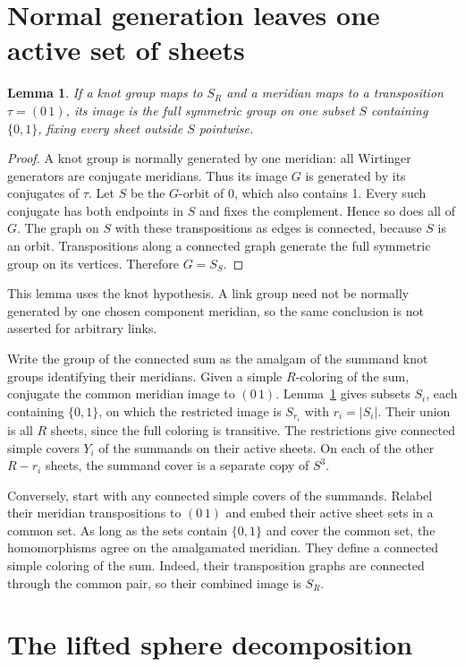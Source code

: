 \documentclass[11pt]{article}
\newtheorem{lemma}[theorem]{Lemma}
\begin{document}
\section{Normal generation leaves one active set of sheets}

\begin{lemma}\label{lem:orbit}
If a knot group maps to $S_R$ and a meridian maps to a
transposition $\tau=(0\,1)$, its image is the full symmetric
group on one subset $S$ containing $\{0,1\}$, fixing every
sheet outside $S$ pointwise.
\end{lemma}
\begin{proof}
A knot group is normally generated by one meridian: all
Wirtinger generators are conjugate meridians. Thus its
image $G$ is generated by its conjugates of $\tau$.
Let $S$ be the $G$-orbit of 0, which also contains 1.
Every such conjugate has both endpoints in $S$ and fixes
the complement. Hence so does all of $G$.
The graph on $S$ with these transpositions as edges is
connected, because $S$ is an orbit. Transpositions along
a connected graph generate the full symmetric group on
its vertices. Therefore $G=S_S$.
\end{proof}

This lemma uses the knot hypothesis. A link group need
not be normally generated by one chosen component meridian,
so the same conclusion is not asserted for arbitrary links.

Write the group of the connected sum as the amalgam of
the summand knot groups identifying their meridians.
Given a simple $R$-coloring of the sum, conjugate the common
meridian image to $(0\,1)$. Lemma~\ref{lem:orbit} gives
subsets $S_i$, each containing $\{0,1\}$, on which the
restricted image is $S_{r_i}$ with $r_i=|S_i|$.
Their union is all $R$ sheets, since the full coloring is
transitive. The restrictions give connected simple covers
$Y_i$ of the summands on their active sheets. On each of
the other $R-r_i$ sheets, the summand cover is a separate
copy of $S^3$.

Conversely, start with any connected simple covers of the
summands. Relabel their meridian transpositions to $(0\,1)$
and embed their active sheet sets in a common set. As long
as the sets contain $\{0,1\}$ and cover the common set,
the homomorphisms agree on the amalgamated meridian.
They define a connected simple coloring of the sum.
Indeed, their transposition graphs are connected through
the common pair, so their combined image is $S_R$.

\section{The lifted sphere decomposition}
\end{document}
